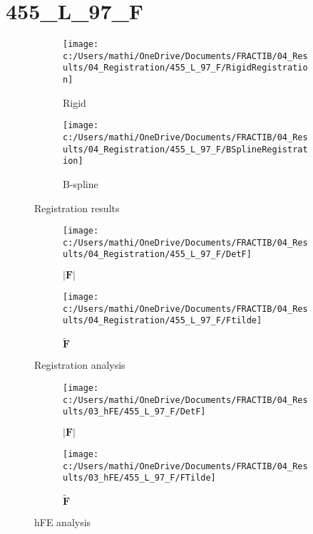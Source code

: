\documentclass{article}%
\begin{document}
%
\newpage%
\section*{455\_L\_97\_F}%
\label{sec:455L97F}%


\begin{figure}[h!]%
\begin{subfigure}[b]{0.5\linewidth}%
\texttt{[image: c:/Users/mathi/OneDrive/Documents/FRACTIB/04\_Results/04\_Registration/455\_L\_97\_F/RigidRegistration]}%
\caption{Rigid}%
\end{subfigure}%
\begin{subfigure}[b]{0.5\linewidth}%
\texttt{[image: c:/Users/mathi/OneDrive/Documents/FRACTIB/04\_Results/04\_Registration/455\_L\_97\_F/BSplineRegistration]}%
\caption{B{-}spline}%
\end{subfigure}%
\caption{Registration results}%
\end{figure}

%


\begin{figure}[h!]%
\begin{subfigure}[b]{0.5\linewidth}%
\texttt{[image: c:/Users/mathi/OneDrive/Documents/FRACTIB/04\_Results/04\_Registration/455\_L\_97\_F/DetF]}%
\caption{$|\mathbf{F}|$}%
\end{subfigure}%
\begin{subfigure}[b]{0.5\linewidth}%
\texttt{[image: c:/Users/mathi/OneDrive/Documents/FRACTIB/04\_Results/04\_Registration/455\_L\_97\_F/Ftilde]}%
\caption{$\tilde{\mathbf{F}}$}%
\end{subfigure}%
\caption{Registration analysis}%
\end{figure}

%


\begin{figure}[h!]%
\begin{subfigure}[b]{0.5\linewidth}%
\texttt{[image: c:/Users/mathi/OneDrive/Documents/FRACTIB/04\_Results/03\_hFE/455\_L\_97\_F/DetF]}%
\caption{$|\mathbf{F}|$}%
\end{subfigure}%
\begin{subfigure}[b]{0.5\linewidth}%
\texttt{[image: c:/Users/mathi/OneDrive/Documents/FRACTIB/04\_Results/03\_hFE/455\_L\_97\_F/FTilde]}%
\caption{$\tilde{\mathbf{F}}$}%
\end{subfigure}%
\caption{hFE analysis}%
\end{figure}
\end{document}

